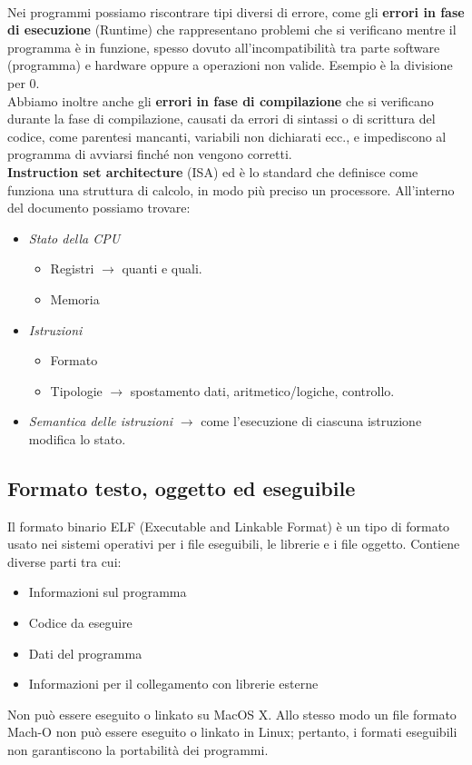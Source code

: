 \\Nei programmi possiamo riscontrare tipi diversi di errore, come gli \textbf{errori in fase di esecuzione} (Runtime) che rappresentano problemi che si verificano mentre il programma è in funzione, spesso dovuto all’incompatibilità tra parte software (programma) e hardware oppure a operazioni non valide. Esempio è la divisione per 0. 
\\Abbiamo inoltre anche gli \textbf{errori in fase di compilazione} che si verificano durante la fase di compilazione, causati da errori di sintassi o di scrittura del codice, come parentesi mancanti, variabili non dichiarati ecc.,  e impediscono al programma di avviarsi finché non vengono corretti.
\\ \textbf{Instruction set architecture} (ISA) ed è lo standard che definisce come funziona una struttura di calcolo, in modo più preciso un processore. All’interno del documento possiamo trovare:
\begin{itemize}
    \item \textit{Stato della CPU}
    \begin{itemize}
        \item Registri $\xrightarrow{}$ quanti e quali. 
        \item Memoria
    \end{itemize}
    \item \textit{Istruzioni}
    \begin{itemize}
        \item Formato
        \item Tipologie $\xrightarrow{}$ spostamento dati, aritmetico/logiche, controllo.
    \end{itemize}
    \item \textit{Semantica delle istruzioni} $\xrightarrow{}$ come l’esecuzione di ciascuna istruzione modifica lo stato.
\end{itemize}

\subsection{Formato testo, oggetto ed eseguibile}
Il formato binario ELF (Executable and Linkable Format) è un tipo di formato usato nei sistemi operativi per i file eseguibili, le librerie e i file oggetto. Contiene diverse parti tra cui:
\begin{itemize}
    \item Informazioni sul programma
    \item Codice da eseguire
    \item Dati del programma
    \item Informazioni per il collegamento con librerie esterne
\end{itemize}
Non può essere eseguito o linkato su MacOS X. Allo stesso modo un file formato Mach-O non può essere eseguito o linkato in Linux; pertanto, i formati eseguibili non garantiscono la portabilità dei programmi.
